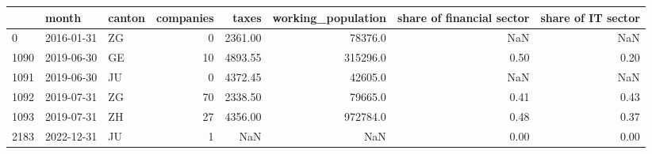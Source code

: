 \begin{tabular}{lllrrrrr}
\toprule
{} &      month & canton &  companies &    taxes &  working\_population &  share of financial sector &  share of IT sector \\
\midrule
0    & 2016-01-31 &     ZG &          0 &  2361.00 &             78376.0 &                        NaN &                 NaN \\
1090 & 2019-06-30 &     GE &         10 &  4893.55 &            315296.0 &                       0.50 &                0.20 \\
1091 & 2019-06-30 &     JU &          0 &  4372.45 &             42605.0 &                        NaN &                 NaN \\
1092 & 2019-07-31 &     ZG &         70 &  2338.50 &             79665.0 &                       0.41 &                0.43 \\
1093 & 2019-07-31 &     ZH &         27 &  4356.00 &            972784.0 &                       0.48 &                0.37 \\
2183 & 2022-12-31 &     JU &          1 &      NaN &                 NaN &                       0.00 &                0.00 \\
\bottomrule
\end{tabular}
